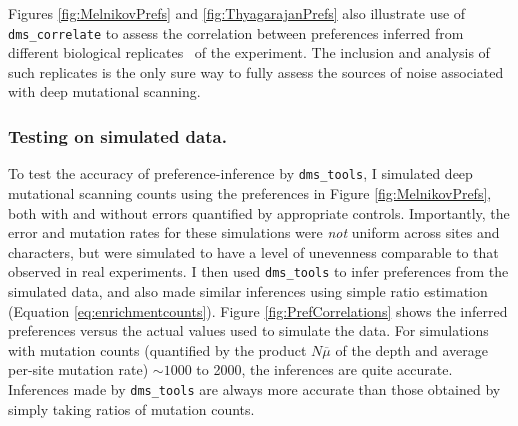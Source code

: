 \documentclass[twocolumn]{bmcart}%
\begin{document}
Figures \ref{fig:MelnikovPrefs} and \ref{fig:ThyagarajanPrefs} also illustrate use of \texttt{dms\_correlate} to assess the correlation between preferences inferred from different biological replicates~\cite{blainey2014points} of the experiment. The inclusion and analysis of such replicates is the only sure way to fully assess the sources of noise associated with deep mutational scanning.

\subsubsection*{Testing on simulated data.}
To test the accuracy of preference-inference by \texttt{dms\_tools}, I simulated deep mutational scanning counts using the preferences in Figure \ref{fig:MelnikovPrefs}, both with and without errors quantified by appropriate controls. Importantly, the error and mutation rates for these simulations were \emph{not} uniform across sites and characters, but were simulated to have a level of unevenness comparable to that observed in real experiments. I then used \texttt{dms\_tools} to infer preferences from the simulated data, and also made similar inferences using simple ratio estimation (Equation \ref{eq:enrichmentcounts}). Figure \ref{fig:PrefCorrelations} shows the inferred preferences versus the actual values used to simulate the data. For simulations with mutation counts (quantified by the product $N\overline{\mu}$ of the depth and average per-site mutation rate) $\sim 1000$ to 2000, the inferences are quite accurate. Inferences made by \texttt{dms\_tools} are always more accurate than those obtained by simply taking ratios of mutation counts.
\end{document}
